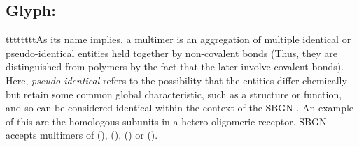
\subsection{Glyph: }
\label{sec:multimer}

ttttttttAs its name implies, a multimer is an aggregation of multiple identical or pseudo-identical entities held together by non-covalent bonds (Thus, they are distinguished from polymers by the fact that the later involve covalent bonds). Here,  \emph{pseudo-identical} refers to the possibility that the entities differ chemically but retain some common global characteristic, such as a structure or function, and so can be considered identical within the context of the SBGN \PD.  An example of this are the homologous subunits in a hetero-oligomeric receptor. SBGN \PD accepts multimers of  (),  (),  () or  ().

